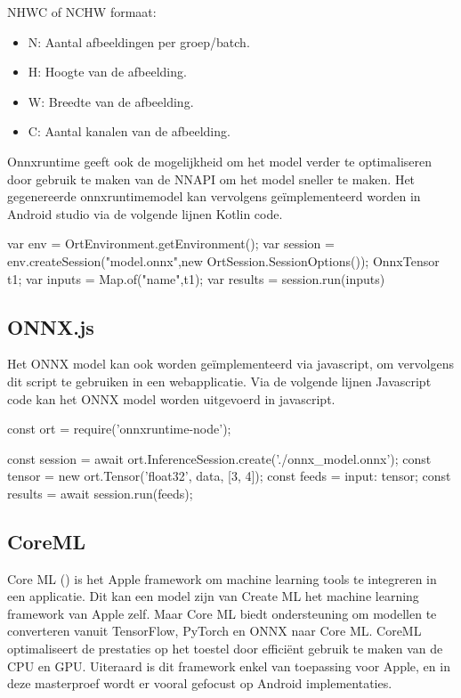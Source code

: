 NHWC of NCHW formaat: 

\begin{itemize} \label{nhwc}
	\item N: Aantal afbeeldingen per groep/batch.
	\item H: Hoogte van de afbeelding.
	\item W: Breedte van de afbeelding.
	\item C: Aantal kanalen van de afbeelding.
\end{itemize}

Onnxruntime geeft ook de mogelijkheid om het model verder te optimaliseren door gebruik te maken van de NNAPI om het model sneller te maken.
Het gegenereerde onnxruntimemodel kan vervolgens ge\"implementeerd worden in Android studio via de volgende lijnen Kotlin code.

\begin{python}
var env = OrtEnvironment.getEnvironment();
var session = env.createSession("model.onnx",new OrtSession.SessionOptions());
OnnxTensor t1;
var inputs = Map.of("name",t1);
var results = session.run(inputs)
\end{python}

\subsection{ONNX.js}
Het ONNX model kan ook worden ge\"implementeerd via javascript, om vervolgens dit script te gebruiken in een webapplicatie.
Via de volgende lijnen Javascript code kan het ONNX model worden uitgevoerd in javascript.

\begin{python}
const ort = require('onnxruntime-node'); 

const session = await ort.InferenceSession.create('./onnx_model.onnx');
const tensor = new ort.Tensor('float32', data, [3, 4]); 
const feeds = { input: tensor}; 
const results = await session.run(feeds);
\end{python}

\subsection{CoreML}
Core ML (\cite{Apple_CoreML_2018}) is het Apple framework om machine learning tools te integreren in een applicatie.
Dit kan een model zijn van Create ML het machine learning framework van Apple zelf.
Maar Core ML biedt ondersteuning om modellen te converteren vanuit TensorFlow, PyTorch en ONNX naar Core ML.
CoreML optimaliseert de prestaties op het toestel door effici\"ent gebruik te maken van de CPU en GPU.
Uiteraard is dit framework enkel van toepassing voor Apple, en in deze masterproef wordt er vooral gefocust op Android implementaties.

